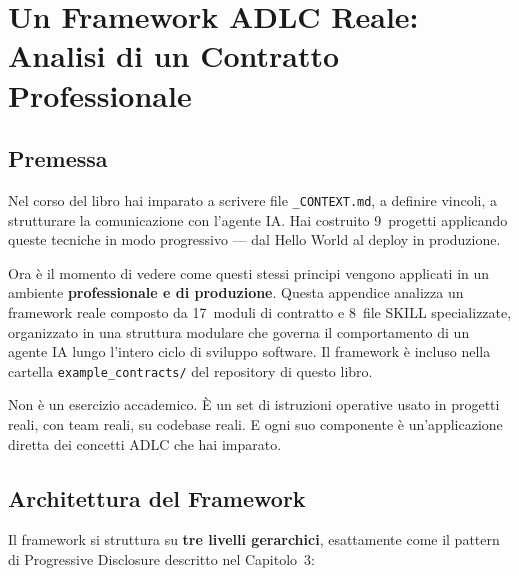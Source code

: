 \chapter{Un Framework ADLC Reale: Analisi di un Contratto Professionale}

\section*{Premessa}

Nel corso del libro hai imparato a scrivere file \texttt{\_CONTEXT.md}, a definire vincoli, a strutturare la comunicazione con l'agente IA. Hai costruito 9~progetti applicando queste tecniche in modo progressivo --- dal Hello World al deploy in produzione.

Ora è il momento di vedere come questi stessi principi vengono applicati in un ambiente \textbf{professionale e di produzione}. Questa appendice analizza un framework reale composto da 17~moduli di contratto e 8~file SKILL specializzate, organizzato in una struttura modulare che governa il comportamento di un agente IA lungo l'intero ciclo di sviluppo software. Il framework è incluso nella cartella \texttt{example\_contracts/} del repository di questo libro.

Non è un esercizio accademico. È un set di istruzioni operative usato in progetti reali, con team reali, su codebase reali. E ogni suo componente è un'applicazione diretta dei concetti ADLC che hai imparato.

\section{Architettura del Framework}

Il framework si struttura su \textbf{tre livelli gerarchici}, esattamente come il pattern di Progressive Disclosure descritto nel Capitolo~3:

